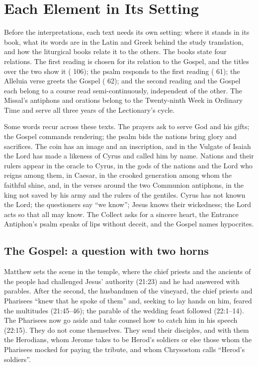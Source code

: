 \section{Each Element in Its Setting}
\label{sec:each-element}

Before the interpretations, each text needs its own setting: where it stands in
its book, what its words are in the Latin and Greek behind the study
translation, and how the liturgical books relate it to the others. The books
state four relations. The first reading is chosen for its relation to the
Gospel, and the titles over the two show it ( 106); the psalm
responds to the first reading ( 61); the Alleluia
verse greets the Gospel ( 62); and the second
reading and the Gospel each belong to a course read semi-continuously,
independent of the other. The Missal's antiphons and orations belong to the
Twenty-ninth Week in Ordinary Time and serve all three years of the
Lectionary's cycle.

Some words recur across these texts. The prayers ask to serve God and his gifts; the Gospel commands
rendering; the psalm bids the nations bring glory and sacrifices. The coin has
an image and an inscription, and in the Vulgate of Isaiah the Lord has made a
likeness of Cyrus and called him by name. Nations and their rulers appear in
the oracle to Cyrus, in the gods of the nations and the Lord who reigns among
them, in Caesar, in the crooked generation among whom the faithful shine, and,
in the verses around the two Communion antiphons, in the king not saved by his
army and the rulers of the gentiles. Cyrus has not known the Lord; the
questioners say ``we know''; Jesus knows their wickedness; the Lord acts so
that all may know. The Collect asks for a sincere heart, the Entrance
Antiphon's psalm speaks of lips without deceit, and the Gospel names
hypocrites.

\subsection{The Gospel: a question with two horns}

Matthew sets the scene in the temple, where the chief priests and the ancients
of the people had challenged Jesus' authority (21:23) and he had answered with
parables. After the second, the husbandmen of the vineyard, the chief priests
and Pharisees ``knew that he spoke of them'' and, seeking to lay hands on him,
feared the multitudes (21:45--46); the parable of the wedding feast followed
(22:1--14). The Pharisees now go aside and take counsel how to
catch him in his speech (22:15). They do not come themselves. They send their
disciples, and with them the Herodians, whom Jerome takes to be Herod's
soldiers or else those whom the Pharisees mocked for paying the tribute, and
whom Chrysostom calls ``Herod's soldiers''.

